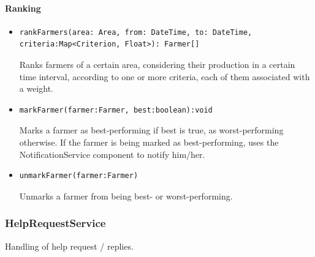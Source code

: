 \documentclass{article}
\begin{document}
\paragraph{Ranking}
\begin{itemize}
\item \begin{verbatim}
rankFarmers(area: Area, from: DateTime, to: DateTime, criteria:Map<Criterion, Float>): Farmer[]
\end{verbatim}
Ranks farmers of a certain area, considering their production in a certain time interval, according to one or more criteria, each of them associated with a weight.
\item \begin{verbatim}
markFarmer(farmer:Farmer, best:boolean):void
\end{verbatim}
Marks a farmer as best-performing if best is true, as worst-performing otherwise. If the farmer is being marked as best-performing, uses the NotificationService component to notify him/her.
\item \begin{verbatim}
unmarkFarmer(farmer:Farmer)
\end{verbatim}
Unmarks a farmer from being best- or worst-performing.
\end{itemize}

\subsubsection{HelpRequestService}
Handling of help request / replies.
\end{document}
